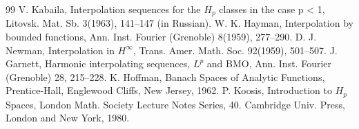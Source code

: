 \begin{thebibliography}{99}
 V. Kabaila, Interpolation sequences for the $H_{p}$ classes in the case p < 1, Litovsk. Mat. Sb. 3(1963), 141--147 (in Russian).
 W. K. Hayman, Interpolation by bounded functions, Ann. Inst. Fourier (Grenoble) 8(1959), 277--290.
 D. J. Newman, Interpolation in $H^{\infty}$, Trans. Amer. Math. Soc. 92(1959), 501--507.
 J. Garnett, Harmonic interpolating sequences, $L^{p}$ and BMO, Ann. Inst. Fourier (Grenoble) 28, 215--228.
 K. Hoffman, Banach Spaces of Analytic Functions, Prentice-Hall, Englewood Cliffs, New Jersey, 1962.
 P. Koosis, Introduction to $H_{p}$ Spaces, London Math. Society Lecture Notes Series, 40. Cambridge Univ. Press, London and New York, 1980.
\end{thebibliography}